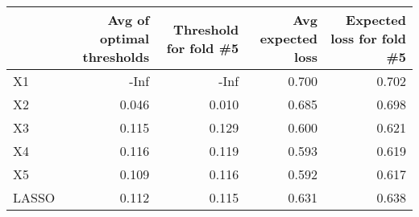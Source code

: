 
\begin{tabular}{lrrrr}
\toprule
  & Avg of optimal thresholds & Threshold for fold \#5 & Avg expected loss & Expected loss for fold \#5\\
\midrule
X1 & -Inf & -Inf & 0.700 & 0.702\\
X2 & 0.046 & 0.010 & 0.685 & 0.698\\
X3 & 0.115 & 0.129 & 0.600 & 0.621\\
X4 & 0.116 & 0.119 & 0.593 & 0.619\\
X5 & 0.109 & 0.116 & 0.592 & 0.617\\
LASSO & 0.112 & 0.115 & 0.631 & 0.638\\
\bottomrule
\end{tabular}